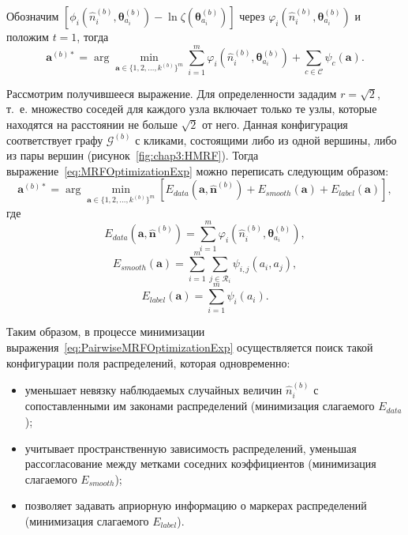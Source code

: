 Обозначим $\left[\phi_i(\hat{n}_i^{(b)}, \boldsymbol{\theta}_{a_i}^{(b)}) - \ln\zeta(\boldsymbol{\theta}_{a_i}^{(b)})\right]$ через $\varphi_i(\hat{n}_i^{(b)}, \boldsymbol{\theta}_{a_i}^{(b)})$ и положим $t=1$, тогда
\begin{equation}
\mathbf{a}^{(b)*} = \arg\min_{\mathbf{a} \in \{1,2,\ldots,k^{(b)}\}^m}
\sum\limits_{i=1}^{m} \varphi_i(\hat{n}_i^{(b)}, \boldsymbol{\theta}_{a_i}^{(b)}) + \sum\limits_{c \in \mathcal{C}} \psi_{c}(\mathbf{a}).
\label{eq:MRFOptimizationExp}
\end{equation}

Рассмотрим получившееся выражение. Для определенности зададим $r=\sqrt{2}$, т.~е. множество соседей для каждого узла включает только те узлы, которые находятся на расстоянии не больше $\sqrt{2}$ от него. Данная конфигурация соответствует графу $\mathcal{G}^{(b)}$ с кликами, состоящими либо из одной вершины, либо из пары вершин (рисунок~\ref{fig:chap3:HMRF}). Тогда выражение~\ref{eq:MRFOptimizationExp} можно переписать следующим образом:
\begin{equation}
\mathbf{a}^{(b)*} = \arg\min_{\mathbf{a} \in \{1,2,\ldots,k^{(b)}\}^m}
\left[ E_{data}(\mathbf{a},\mathbf{\hat{n}}^{(b)}) + E_{smooth}(\mathbf{a}) + E_{label}(\mathbf{a}) \right],
\label{eq:PairwiseMRFOptimizationExp}
\end{equation}
где
\begin{equation*}
E_{data}(\mathbf{a},\mathbf{\hat{n}}^{(b)}) = \sum\limits_{i=1}^{m} \varphi_i(\hat{n}_i^{(b)}, \boldsymbol{\theta}_{a_i}^{(b)}),
\end{equation*}
\begin{equation*}
E_{smooth}(\mathbf{a}) = \sum\limits_{i = 1}^{m} \sum\limits_{j \in \mathcal{R}_i} \psi_{i,j}(a_i,a_j),
\end{equation*}
\begin{equation*}
E_{label}(\mathbf{a}) = \sum\limits_{i = 1}^{m} \psi_{i}(a_i).
\end{equation*}

Таким образом, в процессе минимизации выражения~\ref{eq:PairwiseMRFOptimizationExp} осуществляется поиск такой конфигурации поля распределений, которая одновременно:
\begin{itemize}
  \item уменьшает невязку наблюдаемых случайных величин $\hat{n}_i^{(b)}$ с сопоставленными им законами распределений (минимизация слагаемого $E_{data}$);
  \item учитывает пространственную зависимость распределений, уменьшая рассогласование между метками соседних коэффициентов (минимизация слагаемого $E_{smooth}$);
  \item позволяет задавать априорную информацию о маркерах распределений (минимизация слагаемого $E_{label}$).
\end{itemize}

